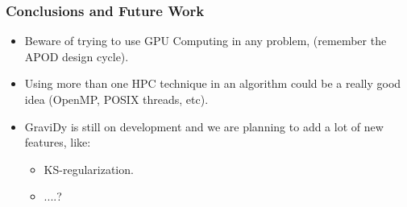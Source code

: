 \begin{frame}
    \frametitle{Conclusions and Future Work}
    \begin{itemize}
        \item Beware of trying to use GPU Computing in any problem,
            (remember the APOD design cycle).
        \item Using more than one HPC technique in an algorithm
            could be a really good idea (OpenMP, POSIX threads, etc).
        \item GraviDy is still on development and we are planning
            to add a lot of new features, like:
        \begin{itemize}
            \item KS-regularization.
            \item ....?
        \end{itemize}
    \end{itemize}
\end{frame}
